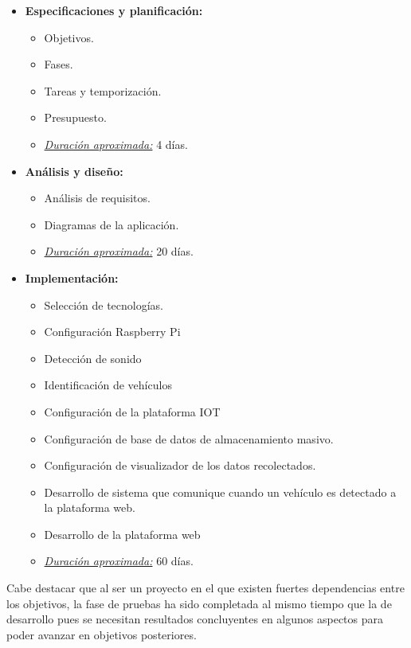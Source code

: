 \begin{itemize}
   \item \textbf{Especificaciones y planificación:}
   \begin{itemize}
    \item Objetivos.
    \item Fases.
    \item Tareas y temporización.
    \item Presupuesto.
    \item \underline{\textit{Duración aproximada:}} 4 días.
   \end{itemize}
\end{itemize}

\begin{itemize}
   \item \textbf{Análisis y diseño:}
   \begin{itemize}
    \item Análisis de requisitos.
    \item Diagramas de la aplicación.
    \item \underline{\textit{Duración aproximada:}} 20 días.
   \end{itemize}
\end{itemize}

\begin{itemize}
 \item \textbf{Implementación:}
 \begin{itemize}
  \item Selección de tecnologías.
  \item Configuración Raspberry Pi
  \item Detección de sonido
  \item Identificación de vehículos
  \item Configuración de la plataforma IOT
  \item Configuración de base de datos de almacenamiento masivo.
  \item Configuración de visualizador de los datos recolectados.
  \item Desarrollo de sistema que comunique cuando un vehículo es detectado a la plataforma web.
  \item Desarrollo de la plataforma web
  \item \underline{\textit{Duración aproximada:}} 60 días.
 \end{itemize}
\end{itemize}

Cabe destacar que al ser un proyecto en el que existen fuertes dependencias entre los objetivos, la fase de pruebas ha sido completada al mismo tiempo que la de desarrollo pues se necesitan resultados concluyentes en algunos aspectos para poder avanzar en objetivos posteriores.

